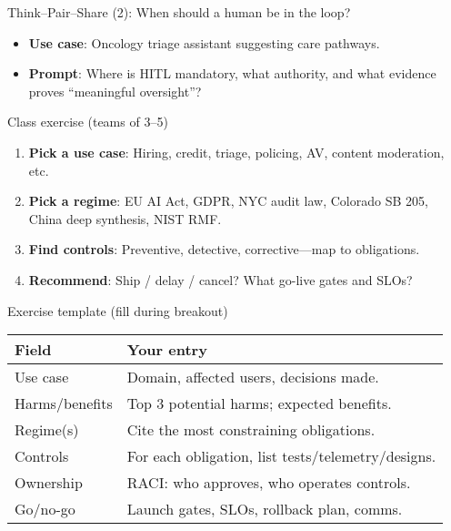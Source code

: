 \documentclass[11pt,aspectratio=169]{beamer}
\begin{document}
\begin{frame}{Think–Pair–Share (2): When should a human be in the loop?}
\begin{itemize}
  \item \textbf{Use case}: Oncology triage assistant suggesting care pathways.
  \item \textbf{Prompt}: Where is HITL mandatory, what authority, and what evidence proves “meaningful oversight”?
\end{itemize}
\end{frame}

\begin{frame}{Class exercise (teams of 3–5)}
\begin{enumerate}
  \item \textbf{Pick a use case}: Hiring, credit, triage, policing, AV, content moderation, etc.
  \item \textbf{Pick a regime}: EU AI Act, GDPR, NYC audit law, Colorado SB 205, China deep synthesis, NIST RMF.
  \item \textbf{Find controls}: Preventive, detective, corrective—map to obligations.
  \item \textbf{Recommend}: Ship / delay / cancel? What go-live gates and SLOs?
\end{enumerate}
\end{frame}

\begin{frame}{Exercise template (fill during breakout)}
\small
\begin{tabular}{p{3.2cm}p{10.2cm}}
\toprule
\textbf{Field} & \textbf{Your entry}\\
\midrule
Use case & Domain, affected users, decisions made.\\
Harms/benefits & Top 3 potential harms; expected benefits.\\
Regime(s) & Cite the most constraining obligations.\\
Controls & For each obligation, list tests/telemetry/designs.\\
Ownership & RACI: who approves, who operates controls.\\
Go/no-go & Launch gates, SLOs, rollback plan, comms.\\
\bottomrule
\end{tabular}
\end{frame}
\end{document}
